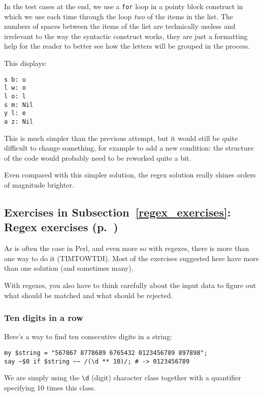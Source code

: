 In the test cases at the end, we use a {\tt for} loop in a 
pointy block construct in which we use each time through the 
loop \emph{two} of the items in the list. The numbers of 
spaces between the items of the list are technically useless 
and irrelevant to the 
way the syntactic construct works, they are just a formatting 
help for the reader to better see how the letters will 
be grouped in the process.

This displays:
\begin{verbatim}
s b: u
l w: o
l o: l
s m: Nil
y l: e
a z: Nil
\end{verbatim}

This is much simpler than the previous attempt, but it would 
still be quite difficult to change something, for example 
to add a new condition: the structure of the code would 
probably need to be reworked quite a bit.

Even compared with this simpler solution, the regex solution 
really shines orders of magnitude brighter.


\subsection{Exercises in Subsection~\ref{regex_exercises}: Regex exercises (p.~\pageref{regex_exercises})}
\label{sol_regex_exercises}

As is often the case in Perl, and even more so with 
regexes, there is more than one way to do it (TIMTOWTDI). 
Most of the exercises suggested here have more than one 
solution (and sometimes many).

With regexes, you also have to think carefully about the 
input data to figure out what should be matched and what 
should be rejected.

\subsubsection{Ten digits in a row}

Here's a way to find ten consecutive digits in a string:

\begin{verbatim}
my $string = "567867 8778689 6765432 0123456789 897898";
say ~$0 if $string ~~ /(\d ** 10)/; # -> 0123456789
\end{verbatim}

We are simply using the \verb'\d' (digit) character class 
together with a quantifier specifying 10 times this class.

